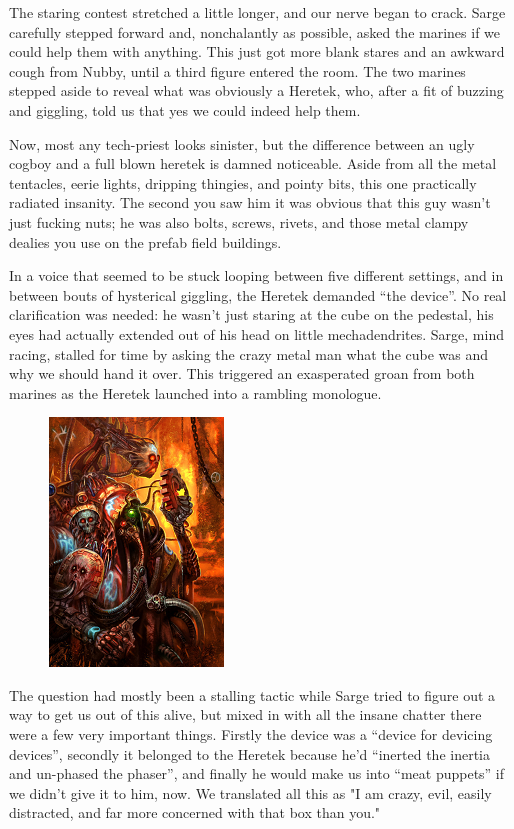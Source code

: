 The staring contest stretched a little longer, and our nerve began to crack. 
Sarge carefully stepped forward and, nonchalantly as possible, asked the marines if we could help them with anything. 
This just got more blank stares and an awkward cough from Nubby, until a third figure entered the room. 
The two marines stepped aside to reveal what was obviously a Heretek, who, after a fit of buzzing and giggling, told us that yes we could indeed help them.
 
Now, most any tech-priest looks sinister, but the difference between an ugly cogboy and a full blown heretek is damned noticeable. 
Aside from all the metal tentacles, eerie lights, dripping thingies, and pointy bits, this one practically radiated insanity. 
The second you saw him it was obvious that this guy wasn’t just fucking nuts; 
he was also bolts, screws, rivets, and those metal clampy dealies you use on the prefab field buildings.
 
In a voice that seemed to be stuck looping between five different settings, and in between bouts of hysterical giggling, the Heretek demanded “the device”. 
No real clarification was needed: 
he wasn’t just staring at the cube on the pedestal, his eyes had actually extended out of his head on little mechadendrites. 
Sarge, mind racing, stalled for time by asking the crazy metal man what the cube was and why we should hand it over. 
This triggered an exasperated groan from both marines as the Heretek launched into a rambling monologue.

\begin{figure}
	\begin{center}
		\includegraphics[width=\figwidth]{pics/8/52.png}
	\end{center}
\end{figure}
The question had mostly been a stalling tactic while Sarge tried to figure out a way to get us out of this alive, but mixed in with all the insane chatter there were a few very important things. 
Firstly the device was a “device for devicing devices”, secondly it belonged to the Heretek because he'd “inerted the inertia and un-phased the phaser”, and finally he would make us into “meat puppets” if we didn't give it to him, now. 
We translated all this as "I am crazy, evil, easily distracted, and far more concerned with that box than you."
 
